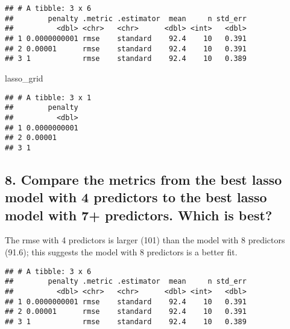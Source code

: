 \documentclass[
]{article}
\newenvironment{Shaded}{\begin{snugshade}}{\end{snugshade}}
\newcommand{\DataTypeTok}[1]{\textcolor[rgb]{0.13,0.29,0.53}{#1}}
\newcommand{\DecValTok}[1]{\textcolor[rgb]{0.00,0.00,0.81}{#1}}
\newcommand{\KeywordTok}[1]{\textcolor[rgb]{0.13,0.29,0.53}{\textbf{#1}}}
\newcommand{\NormalTok}[1]{#1}
\newcommand{\OperatorTok}[1]{\textcolor[rgb]{0.81,0.36,0.00}{\textbf{#1}}}
\newcommand{\StringTok}[1]{\textcolor[rgb]{0.31,0.60,0.02}{#1}}
\begin{document}
\begin{verbatim}
## # A tibble: 3 x 6
##        penalty .metric .estimator  mean     n std_err
##          <dbl> <chr>   <chr>      <dbl> <int>   <dbl>
## 1 0.0000000001 rmse    standard    92.4    10   0.391
## 2 0.00001      rmse    standard    92.4    10   0.391
## 3 1            rmse    standard    92.4    10   0.389
\end{verbatim}

\begin{Shaded}
\begin{Highlighting}[]
\NormalTok{lasso_grid}
\end{Highlighting}
\end{Shaded}

\begin{verbatim}
## # A tibble: 3 x 1
##        penalty
##          <dbl>
## 1 0.0000000001
## 2 0.00001     
## 3 1
\end{verbatim}

\hypertarget{compare-the-metrics-from-the-best-lasso-model-with-4-predictors-to-the-best-lasso-model-with-7-predictors.-which-is-best}{%
\subsection{8. Compare the metrics from the best lasso model with 4
predictors to the best lasso model with 7+ predictors. Which is
best?}\label{compare-the-metrics-from-the-best-lasso-model-with-4-predictors-to-the-best-lasso-model-with-7-predictors.-which-is-best}}

The rmse with 4 predictors is larger (101) than the model with 8
predictors (91.6); this suggests the model with 8 predictors is a better
fit.

\begin{Shaded}
\end{Shaded}

\begin{verbatim}
## # A tibble: 3 x 6
##        penalty .metric .estimator  mean     n std_err
##          <dbl> <chr>   <chr>      <dbl> <int>   <dbl>
## 1 0.0000000001 rmse    standard    92.4    10   0.391
## 2 0.00001      rmse    standard    92.4    10   0.391
## 3 1            rmse    standard    92.4    10   0.389
\end{verbatim}
\end{document}
